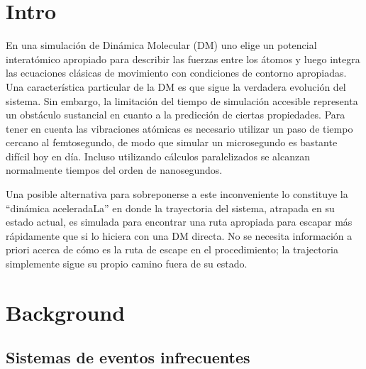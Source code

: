 \documentclass[a4paper,12pt]{article}
\begin{document}


\section{Intro}

En una simulación de Dinámica Molecular (DM) uno elige un potencial
interatómico apropiado para describir las fuerzas entre los átomos y luego
integra las ecuaciones clásicas de movimiento con condiciones de contorno
apropiadas. Una característica particular de la DM es que sigue la verdadera
evolución del sistema. Sin embargo, la limitación del tiempo de simulación
accesible representa un obstáculo sustancial en cuanto a la predicción de
ciertas propiedades. Para tener en cuenta las vibraciones atómicas es
necesario utilizar un paso de tiempo cercano al femtosegundo, de modo que
simular un microsegundo es bastante difícil hoy en día. Incluso utilizando
cálculos paralelizados se alcanzan normalmente tiempos del orden de
nanosegundos.


Una posible alternativa para sobreponerse a este inconveniente lo constituye
la ``dinámica  aceleradaLa'' en donde la trayectoria del sistema, atrapada en su estado
actual, es simulada para encontrar una ruta apropiada para escapar más
rápidamente que si lo hiciera con una DM directa. No se necesita información a
priori acerca de cómo es la ruta de escape en el procedimiento; la trajectoria
simplemente sigue su propio camino fuera de su estado.


\section{Background}

\subsection{Sistemas de eventos infrecuentes}
\end{document}

